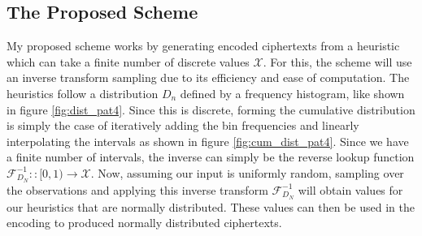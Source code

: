\documentclass[ %
                    author={Samuel Russell},
                supervisor={Prof. Bogdan Warinschi},
                    degree={MEng},
                     title={Innocuous Ciphertexts},
                  subtitle={The DE-CENSOR Scheme},
                      type={Research},
                      year={2018} ]{dissertation}
\begin{document}
\subsection{The Proposed Scheme}

My proposed scheme works by generating encoded ciphertexts from a heuristic which can take a finite number of discrete values $\mathcal{X}$. For this, the scheme will use an inverse transform sampling due to its efficiency and ease of computation.
The heuristics follow a distribution $D_n$ defined by a frequency histogram, like shown in figure \ref{fig:dist_pat4}.
Since this is discrete, forming the cumulative distribution is simply the case of iteratively adding the bin frequencies and linearly interpolating the intervals as shown in figure \ref{fig:cum_dist_pat4}.
Since we have a finite number of intervals, the inverse can simply be the reverse lookup function $\mathcal{F}^{-1}_{D_N} :: [0,1) \rightarrow \mathcal{X}$.
Now, assuming our input is uniformly random, sampling over the observations and applying this inverse transform $\mathcal{F}^{-1}_{D_N}$ will obtain values for our heuristics that are normally distributed.
These values can then be used in the encoding to produced normally distributed ciphertexts.
\end{document}
